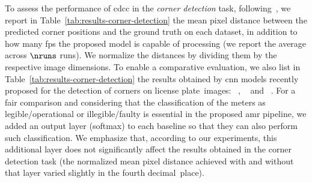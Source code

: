 To assess the performance of \gls*{cdcc} in the \textit{corner detection} task, following~\cite{yoo2020deep}, we report in Table~\ref{tab:results-corner-detection} the mean pixel distance between the predicted corner positions and the ground truth on each dataset, in addition to how many \gls*{fps} the proposed model is capable of processing (we report the average across $\nruns$ runs).
We normalize the distances by dividing them by the respective image dimensions.
To enable a comparative evaluation, we also list in Table~\ref{tab:results-corner-detection} the results obtained by \numbaselinescdcc \gls*{cnn} models recently proposed for the detection of corners on license plate~images: \smallerlocatenet~\cite{meng2018robust}, \locatenet~\cite{meng2018robust} and \yoohybrid~\cite{yoo2020deep}.
For a fair comparison and considering that the classification of the meters as legible/operational or illegible/faulty is essential in the proposed \gls*{amr} pipeline, we added an output layer (softmax) to each baseline so that they can also perform such classification.
We emphasize that, according to our experiments,  this additional layer does not significantly affect the results obtained in the corner detection task (the normalized mean pixel distance achieved with and without that layer varied slightly in the fourth decimal~place).

\begin{table}[!htb]
\setlength{\tabcolsep}{8pt}
\centering
\caption{\small Comparison of the corner detection results obtained by \gls*{cdcc} and \numbaselinescdcc baselines.
The proposed model presents similar accuracy to \yoohybrid but is twice as fast.
Also, it performs almost as fast as \smallerlocatenet, even though it predicts much more accurate corner~positions.}
\label{tab:results-corner-detection}

\vspace{0.5mm}

 \end{table}

